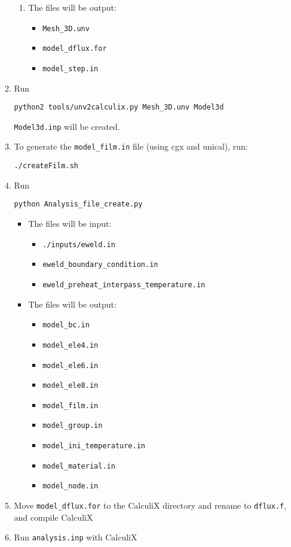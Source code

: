 \documentclass[12pt,letterpaper]{article}
\newcommand{\verbStyle}[1]{{\color{SteelBlue40}\colorbox{LightSteelBlue10}{{#1}}}}
\let\OldTexttt\texttt
\renewcommand{\texttt}[1]{\OldTexttt{\verbStyle{#1}}}
\begin{document}
\begin{itemize}
\begin{enumerate}
\begin{enumerate}
\item The files will be output: 
\begin{itemize}
\item \texttt{Mesh\_3D.unv}
\item \texttt{model\_dflux.for}
\item \texttt{model\_step.in}
\end{itemize}
\end{enumerate}
\item Run 
\begin{verbatim}
python2 tools/unv2calculix.py Mesh_3D.unv Model3d
\end{verbatim}
\texttt{Model3d.inp} will be created.
\item To generate the \texttt{model\_film.in} file (using cgx and unical), run:
\begin{verbatim}
./createFilm.sh
\end{verbatim}
\item Run 
\begin{verbatim}
python Analysis_file_create.py
\end{verbatim}
\begin{itemize}
\item The files will be input:
\begin{itemize}
\item \texttt{./inputs/eweld.in}
\item \texttt{eweld\_boundary\_condition.in}
\item \texttt{eweld\_preheat\_interpass\_temperature.in}
\end{itemize}
\item The files will be output:
\begin{itemize}
\item \texttt{model\_bc.in}
\item \texttt{model\_ele4.in}
\item \texttt{model\_ele6.in}
\item \texttt{model\_ele8.in}
\item \texttt{model\_film.in}
\item \texttt{model\_group.in}
\item \texttt{model\_ini\_temperature.in}
\item \texttt{model\_material.in}
\item \texttt{model\_node.in}
\end{itemize}
\end{itemize}
\item Move \texttt{model\_dflux.for} to the CalculiX directory and rename to \texttt{dflux.f}, and compile CalculiX
\item Run \texttt{analysis.inp} with CalculiX
\end{enumerate}
\end{itemize}
\end{document}
